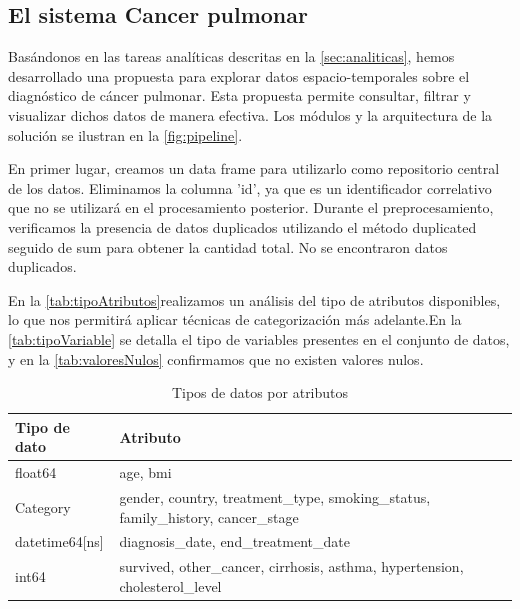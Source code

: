 \documentclass[10pt,journal,compsoc]{IEEEtran}
\begin{document}
\subsection{El sistema Cancer pulmonar}
Basándonos en las tareas analíticas descritas en la  \autoref{sec:analiticas}, hemos desarrollado una propuesta para explorar datos espacio-temporales sobre el diagnóstico de cáncer pulmonar. Esta propuesta permite consultar, filtrar y visualizar dichos datos de manera efectiva. Los módulos y la arquitectura de la solución se ilustran en la \autoref{fig:pipeline}.

En primer lugar, creamos un data frame para utilizarlo como repositorio central de los datos. Eliminamos la columna 'id', ya que es un identificador correlativo que no se utilizará en el procesamiento posterior. Durante el preprocesamiento, verificamos la presencia de datos duplicados utilizando el método duplicated seguido de sum para obtener la cantidad total. No se encontraron datos duplicados.

En la \autoref{tab:tipoAtributos}realizamos un análisis del tipo de atributos disponibles, lo que nos permitirá aplicar técnicas de categorización más adelante.En la \autoref{tab:tipoVariable} se detalla el tipo de variables presentes en el conjunto de datos, y en la \autoref{tab:valoresNulos} confirmamos que no existen valores nulos.





\begin{table}[h!]
\centering
\begin{tabularx}{\columnwidth}{|l|X|}
\hline
\textbf{Tipo de dato}   & \textbf{Atributo}  \\ \hline
float64                 & age, bmi    \\ \hline
Category                & gender, country, treatment\_type, smoking\_status, family\_history, cancer\_stage  \\ \hline
datetime64[ns]          & diagnosis\_date, end\_treatment\_date   \\ \hline
int64                   & survived, other\_cancer, cirrhosis, asthma, hypertension, cholesterol\_level   \\ \hline
\end{tabularx}
\caption{Tipos de datos por atributos}
\label{tab:tipoAtributos}
\end{table}
\end{document}
